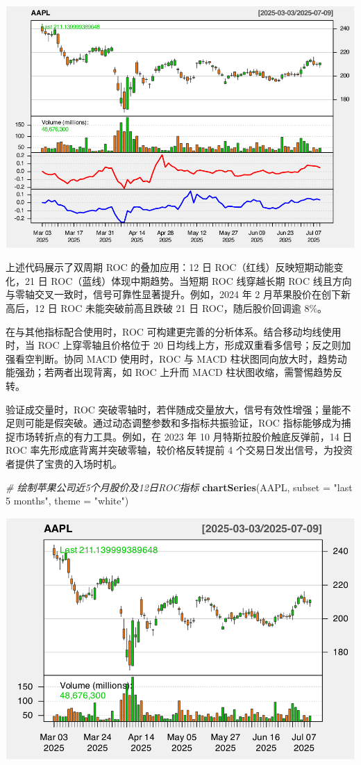 \documentclass[]{ctexbook}
\newenvironment{Shaded}{\begin{snugshade}}{\end{snugshade}}
\newcommand{\AttributeTok}[1]{\textcolor[rgb]{0.13,0.29,0.53}{#1}}
\newcommand{\CommentTok}[1]{\textcolor[rgb]{0.56,0.35,0.01}{\textit{#1}}}
\newcommand{\FunctionTok}[1]{\textcolor[rgb]{0.13,0.29,0.53}{\textbf{#1}}}
\newcommand{\NormalTok}[1]{#1}
\newcommand{\StringTok}[1]{\textcolor[rgb]{0.31,0.60,0.02}{#1}}
\begin{document}
\includegraphics[width=0.9\linewidth]{quantmod_files/figure-latex/roc-3}

上述代码展示了双周期 ROC 的叠加应用：12 日 ROC（红线）反映短期动能变化，21 日 ROC（蓝线）体现中期趋势。当短期 ROC 线穿越长期 ROC 线且方向与零轴交叉一致时，信号可靠性显著提升。例如，2024 年 2 月苹果股价在创下新高后，12 日 ROC 未能突破前高且跌破 21 日 ROC，随后股价回调逾 8\%。

在与其他指标配合使用时，ROC 可构建更完善的分析体系。结合移动均线使用时，当 ROC 上穿零轴且价格位于 20 日均线上方，形成双重看多信号；反之则加强看空判断。协同 MACD 使用时，ROC 与 MACD 柱状图同向放大时，趋势动能强劲；若两者出现背离，如 ROC 上升而 MACD 柱状图收缩，需警惕趋势反转。

验证成交量时，ROC 突破零轴时，若伴随成交量放大，信号有效性增强；量能不足则可能是假突破。通过动态调整参数和多指标共振验证，ROC 指标能够成为捕捉市场转折点的有力工具。例如，在 2023 年 10 月特斯拉股价触底反弹前，14 日 ROC 率先形成底背离并突破零轴，较价格反转提前 4 个交易日发出信号，为投资者提供了宝贵的入场时机。

\begin{Shaded}
\begin{Highlighting}[]
\CommentTok{\# 绘制苹果公司近5个月股价及12日ROC指标  }
\FunctionTok{chartSeries}\NormalTok{(AAPL, }\AttributeTok{subset =} \StringTok{"last 5 months"}\NormalTok{, }\AttributeTok{theme =} \StringTok{"white"}\NormalTok{)  }
\end{Highlighting}
\end{Shaded}

\includegraphics[width=0.9\linewidth]{quantmod_files/figure-latex/roc_2-1}
\end{document}

